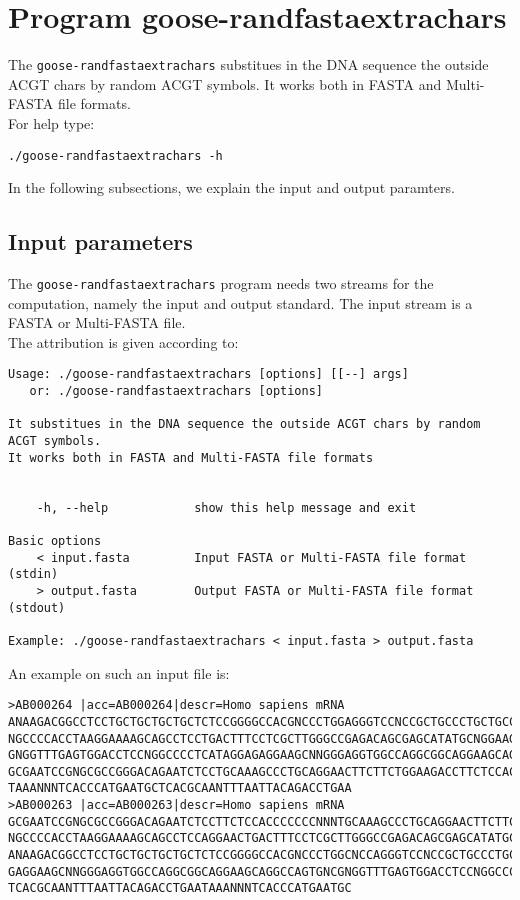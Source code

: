 \section{Program goose-randfastaextrachars}
The \texttt{goose-randfastaextrachars} substitues in the DNA sequence the outside ACGT chars by random ACGT symbols. It works both in FASTA and Multi-FASTA file formats.\\
For help type:
\begin{lstlisting}
./goose-randfastaextrachars -h
\end{lstlisting}
In the following subsections, we explain the input and output paramters.

\subsection*{Input parameters}

The \texttt{goose-randfastaextrachars} program needs two streams for the computation,
namely the input and output standard. The input stream is a FASTA or Multi-FASTA file.\\
The attribution is given according to:
\begin{lstlisting}
Usage: ./goose-randfastaextrachars [options] [[--] args]
   or: ./goose-randfastaextrachars [options]

It substitues in the DNA sequence the outside ACGT chars by random ACGT symbols.
It works both in FASTA and Multi-FASTA file formats


    -h, --help            show this help message and exit

Basic options
    < input.fasta         Input FASTA or Multi-FASTA file format (stdin)
    > output.fasta        Output FASTA or Multi-FASTA file format (stdout)

Example: ./goose-randfastaextrachars < input.fasta > output.fasta
\end{lstlisting}

An example on such an input file is:
\begin{lstlisting}
>AB000264 |acc=AB000264|descr=Homo sapiens mRNA 
ANAAGACGGCCTCCTGCTGCTGCTGCTCTCCGGGGCCACGNCCCTGGAGGGTCCNCCGCTGCCCTGCTGCCATTGNCNCC
NGCCCCACCTAAGGAAAAGCAGCCTCCTGACTTTCCTCGCTTGGGCCGAGACAGCGAGCATATGCNGGAAGCGGCAGGAA
GNGGTTTGAGTGGACCTCCNGGCCCCTCATAGGAGAGGAAGCNNGGGAGGTGGCCAGGCGGCAGGAAGCAGGCCAGTGNC
GCGAATCCGNGCGCCGGGACAGAATCTCCTGCAAAGCCCTGCAGGAACTTCTTCTGGAAGACCTTCTCCACCCCCCCNNN
TAAANNNTCACCCATGAATGCTCACGCAANTTTAATTACAGACCTGAA
>AB000263 |acc=AB000263|descr=Homo sapiens mRNA 
GCGAATCCGNGCGCCGGGACAGAATCTCCTTCTCCACCCCCCCNNNTGCAAAGCCCTGCAGGAACTTCTTCTGGAAGACC
NGCCCCACCTAAGGAAAAGCAGCCTCCAGGAACTGACTTTCCTCGCTTGGGCCGAGACAGCGAGCATATGCNGGAAGCGG
ANAAGACGGCCTCCTGCTGCTGCTGCTCTCCGGGGCCACGNCCCTGGCNCCAGGGTCCNCCGCTGCCCTGCTGCCATTGN
GAGGAAGCNNGGGAGGTGGCCAGGCGGCAGGAAGCAGGCCAGTGNCGNGGTTTGAGTGGACCTCCNGGCCCCTCATAGGA
TCACGCAANTTTAATTACAGACCTGAATAAANNNTCACCCATGAATGC
\end{lstlisting}

